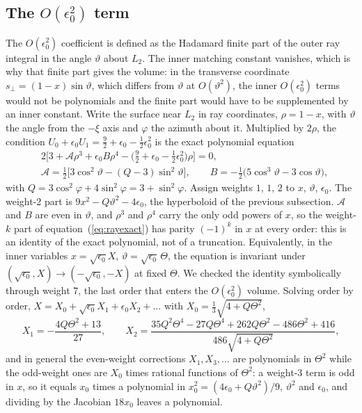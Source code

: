 \documentclass[twocolumn]{aastex702}
\begin{document}
\subsection*{The $O(\epsilon_0^2)$ term}
The $O(\epsilon_0^2)$ coefficient is defined as the Hadamard finite part of the outer ray integral in the angle $\vartheta$ about $L_2$. The inner matching constant vanishes, which is why that finite part gives the volume: in the transverse coordinate $s_\perp=(1-x)\sin\vartheta$, which differs from $\vartheta$ at $O(\vartheta^2)$, the inner $O(\epsilon_0^2)$ terms would not be polynomials and the finite part would have to be supplemented by an inner constant. Write the surface near $L_2$ in ray coordinates, $\rho=1-x$, with $\vartheta$ the angle from the $-\xi$ axis and $\varphi$ the azimuth about it. Multiplied by $2\rho$, the condition $U_0+\epsilon_0 U_1=\tfrac92+\epsilon_0-\tfrac12\epsilon_0^2$ is the exact polynomial equation
\begin{equation}
\begin{split}
&2\Big[3+\mathcal A\rho^3+\epsilon_0 B\rho^4-\big(\tfrac92+\epsilon_0-\tfrac12\epsilon_0^2\big)\rho\Big]=0,\\
&\mathcal A=\tfrac12\big[3\cos^2\vartheta-(Q-3)\sin^2\vartheta\big],\qquad B=-\tfrac12\big(5\cos^3\vartheta-3\cos\vartheta\big),
\end{split}
\label{eq:rayexact}
\end{equation}
with $Q=3\cos^2\varphi+4\sin^2\varphi=3+\sin^2\varphi$. Assign weights $1$, $1$, $2$ to $x$, $\vartheta$, $\epsilon_0$. The weight-2 part is $9x^2-Q\vartheta^2-4\epsilon_0$, the hyperboloid of the previous subsection. $\mathcal A$ and $B$ are even in $\vartheta$, and $\rho^3$ and $\rho^4$ carry the only odd powers of $x$, so the weight-$k$ part of equation~(\ref{eq:rayexact}) has parity $(-1)^k$ in $x$ at every order: this is an identity of the exact polynomial, not of a truncation. Equivalently, in the inner variables $x=\sqrt{\epsilon_0} X$, $\vartheta=\sqrt{\epsilon_0}\,\Theta$, the equation is invariant under $(\sqrt{\epsilon_0},X)\to(-\sqrt{\epsilon_0},-X)$ at fixed $\Theta$. We checked the identity symbolically through weight 7, the last order that enters the $O(\epsilon_0^2)$ volume. Solving order by order, $X=X_0+\sqrt{\epsilon_0} X_1+\epsilon_0 X_2+\ldots$ with $X_0=\tfrac13\sqrt{4+Q\Theta^2}$,
\begin{equation}
X_1=-\frac{4Q\Theta^2+13}{27},\qquad
X_2=\frac{35Q^2\Theta^4-27Q\Theta^4+262Q\Theta^2-486\Theta^2+416}{486\sqrt{4+Q\Theta^2}},
\end{equation}
and in general the even-weight corrections $X_1,X_3,\ldots$ are polynomials in $\Theta^2$ while the odd-weight ones are $X_0$ times rational functions of $\Theta^2$: a weight-3 term is odd in $x$, so it equals $x_0$ times a polynomial in $x_0^2=(4\epsilon_0+Q\vartheta^2)/9$, $\vartheta^2$ and $\epsilon_0$, and dividing by the Jacobian $18x_0$ leaves a polynomial.
\end{document}
